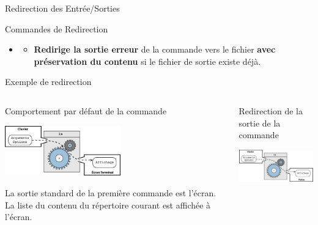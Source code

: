 \begin{frame}{Redirection des Entrée/Sorties}
\begin{block}{Commandes de Redirection}
\begin{itemize}
\begin{itemize}
        fichier de sortie existe déjà.
      \end{itemize}
    \item {}
      \begin{itemize}
      \item \textbf{{\color{solarizedRed}Redirige la sortie erreur}} de la
        commande  vers le fichier 
        \textbf{{\color{solarizedBlue}avec préservation du contenu}} si le
        fichier de sortie existe déjà.
      \end{itemize}
    \end{itemize}
  \end{block}
\end{frame}
\begin{frame}{Exemple de redirection}
  \begin{columns}
    \begin{column}{5.5cm}
      \begin{block}{Comportement par défaut de la commande }
      \end{block}
      \begin{center}
        \includegraphics[width=5cm]{img/s05/stdin_stdout_commande_2.jpg}
      \end{center}
      \scriptsize{  } La sortie standard de la première
      commande  est l'écran. La liste du contenu du répertoire
      courant est affichée à l'écran.\\\vspace{20pt}
    \end{column}
    \begin{column}{5.5cm}
      \begin{alertblock}{Redirection de la sortie de la commande
          }
      \end{alertblock}
      \begin{center}
        \includegraphics[width=5cm]{img/s05/stdin_stdout_commande_3.jpg}

\end{center}
\end{column}
\end{columns}
\end{frame}
